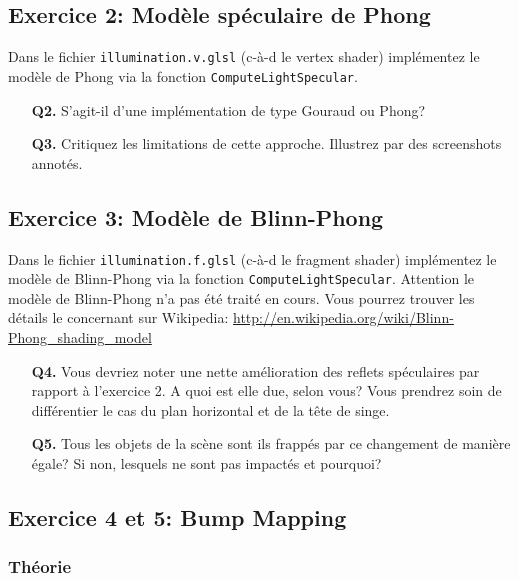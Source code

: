 \documentclass{article}
\begin{document}
\subsection{Exercice 2: Modèle spéculaire de Phong}%

Dans le fichier \verb|illumination.v.glsl| (c-à-d le vertex shader) implémentez le modèle de Phong via la
fonction \verb|ComputeLightSpecular|.

\begin{itemize}
  \item[{\bf Q2.}] S'agit-il d'une implémentation de type Gouraud ou Phong? 
  \item[{\bf Q3.}] Critiquez les limitations de cette approche. Illustrez par des screenshots annotés.
\end{itemize}

\subsection{Exercice 3: Modèle de Blinn-Phong}%

Dans le fichier \verb|illumination.f.glsl| (c-à-d le fragment shader) implémentez le modèle de Blinn-Phong
via la fonction \verb|ComputeLightSpecular|. Attention le modèle de Blinn-Phong
n'a pas été traité en cours. Vous pourrez trouver les détails le concernant sur
Wikipedia:
\url{http://en.wikipedia.org/wiki/Blinn-Phong_shading_model}

\begin{itemize}
  \item[{\bf Q4.}] Vous devriez noter une nette amélioration des reflets spéculaires par
    rapport à l'exercice 2. A quoi est elle due, selon vous? Vous prendrez soin de différentier le cas du plan horizontal et de la tête de singe.
  \item[{\bf Q5.}] Tous les objets de la scène sont ils frappés par ce changement de manière égale? Si non, lesquels ne sont pas impactés et pourquoi?
\end{itemize}                         

\subsection{Exercice 4 et 5: Bump Mapping}%

\subsubsection{Théorie}
\end{document}
